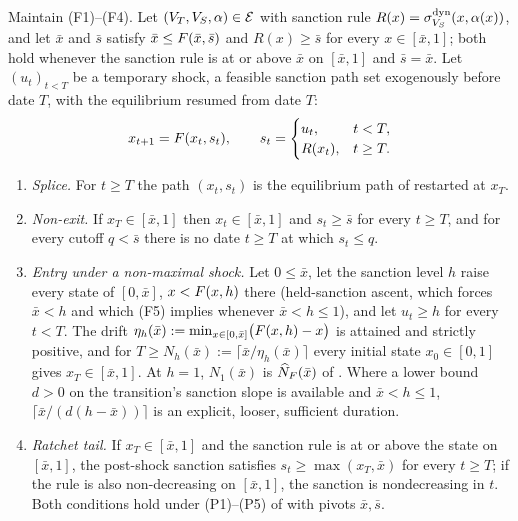 \begin{theorem}
\label{thm:finite-episode}
Maintain \textup{(F1)--(F4)}. Let $(V_T,V_S,\alpha)\in\mathcal E$ with
sanction rule $R(x)=\sigma^{\mathrm{dyn}}_{V_S}(x,\alpha(x))$, and let
$\bar x$ and $\bar s$ satisfy $\bar x\le F(\bar x,\bar s)$ and
$R(x)\ge\bar s$ for every $x\in[\bar x,1]$; both hold whenever the sanction
rule is at or above $\bar x$ on $[\bar x,1]$ and $\bar s=\bar x$. Let
$(u_t)_{t<T}$ be a temporary shock, a feasible sanction path set exogenously before date $T$, with
the equilibrium resumed from date $T$:
\[
x_{t+1}=F(x_t,s_t),\qquad
s_t=\begin{cases}u_t,&t<T,\\ R(x_t),&t\ge T.\end{cases}
\]
\begin{enumerate}[label=(\roman*)]
\item \emph{Splice.} For $t\ge T$ the path $(x_t,s_t)$ is the equilibrium
path of  restarted at $x_T$.
\item \emph{Non-exit.} If $x_T\in[\bar x,1]$ then $x_t\in[\bar x,1]$ and
$s_t\ge\bar s$ for every $t\ge T$, and for every cutoff $q<\bar s$ there is
no date $t\ge T$ at which $s_t\le q$.
\item \emph{Entry under a non-maximal shock.} Let $0\le\bar x$, let the
sanction level $h$ raise every state of $[0,\bar x]$, $x<F(x,h)$ there
(held-sanction ascent, which forces $\bar x<h$ and which \textup{(F5)}
implies whenever $\bar x<h\le1$), and let $u_t\ge h$ for every $t<T$. The drift
$\eta_h(\bar x):=\min_{x\in[0,\bar x]}\bigl(F(x,h)-x\bigr)$ is attained and
strictly positive, and for $T\ge N_h(\bar x):=\lceil\bar x/\eta_h(\bar x)\rceil$
every initial state $x_0\in[0,1]$ gives $x_T\in[\bar x,1]$. At $h=1$,
$N_1(\bar x)$ is $\widehat N_{F}(\bar x)$ of . Where a lower
bound $d>0$ on the transition's sanction slope is available and $\bar x<h\le1$,
$\lceil\bar x/(d(h-\bar x))\rceil$ is an explicit, looser, sufficient
duration.
\item \emph{Ratchet tail.} If $x_T\in[\bar x,1]$ and the sanction rule is at
or above the state on $[\bar x,1]$, the post-shock sanction satisfies
$s_t\ge\max(x_T,\bar x)$ for every $t\ge T$; if the rule is also
non-decreasing on $[\bar x,1]$, the sanction is nondecreasing in $t$. Both
conditions hold under \textup{(P1)--(P5)} of  with
pivots $\bar x,\bar s$.
\end{enumerate}
\end{theorem}

